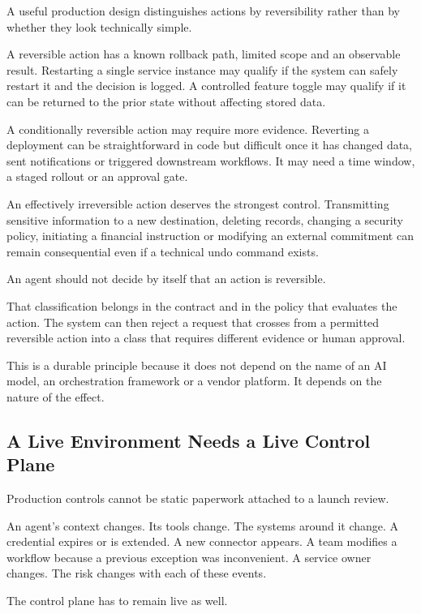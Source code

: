 A useful production design distinguishes actions by reversibility rather
than by whether they look technically simple.

A reversible action has a known rollback path, limited scope and an
observable result. Restarting a single service instance may qualify if
the system can safely restart it and the decision is logged. A
controlled feature toggle may qualify if it can be returned to the prior
state without affecting stored data.

A conditionally reversible action may require more evidence. Reverting a
deployment can be straightforward in code but difficult once it has
changed data, sent notifications or triggered downstream workflows. It
may need a time window, a staged rollout or an approval gate.

An effectively irreversible action deserves the strongest control.
Transmitting sensitive information to a new destination, deleting
records, changing a security policy, initiating a financial instruction
or modifying an external commitment can remain consequential even if a
technical undo command exists.

An agent should not decide by itself that an action is reversible.

That classification belongs in the contract and in the policy that
evaluates the action. The system can then reject a request that crosses
from a permitted reversible action into a class that requires different
evidence or human approval.

This is a durable principle because it does not depend on the name of an
AI model, an orchestration framework or a vendor platform. It depends on
the nature of the effect.

\subsection{A Live Environment Needs a Live Control
Plane}\label{a-live-environment-needs-a-live-control-plane}

Production controls cannot be static paperwork attached to a launch
review.

An agent's context changes. Its tools change. The systems around it
change. A credential expires or is extended. A new connector appears. A
team modifies a workflow because a previous exception was inconvenient.
A service owner changes. The risk changes with each of these events.

The control plane has to remain live as well.

